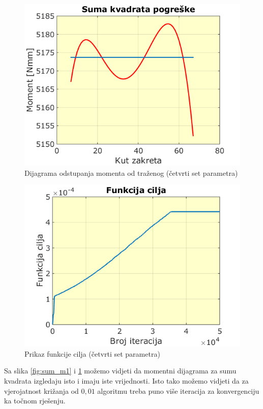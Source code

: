 \begin{figure}[h!]
\center
\includegraphics[scale=.6]{slike/sum_m2.png}
\caption{Dijagrama odstupanja momenta od traženog (četvrti set parametra)}
\label{fig:sum_m2}
\end{figure}

\begin{figure}[h!]
\center
\includegraphics[scale=.6]{slike/sum_f2.png}
\caption{Prikaz funkcije cilja (četvrti set parametra)}
\label{fig:sum_f2}
\end{figure}


Sa slika \ref{fig:sum_m1} i \ref{fig:sum_m2} možemo vidjeti da momentni dijagrama za sumu kvadrata izgledaju isto i imaju iste vrijednosti. Isto tako možemo vidjeti da za vjerojatnost križanja od $0,01$ algoritmu treba puno više iteracija za konvergenciju ka točnom rješenju.


